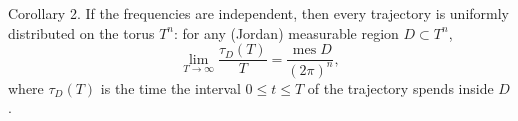 Corollary 2. If the frequencies are independent, then every trajectory is uniformly distributed on the torus $T^n$: for any (Jordan) measurable region $D \subset T^n$,
$$\lim_{T \to \infty} \frac{\tau_D(T)}{T} = \frac{\operatorname{mes} D}{(2\pi)^n},$$
where $\tau_D(T)$ is the time the interval $0 \leq t \leq T$ of the trajectory spends inside $D$.
